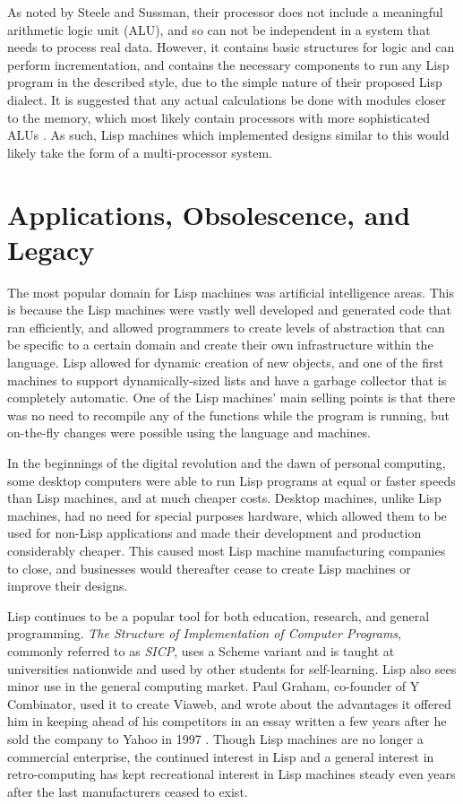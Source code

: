 \documentclass[journal]{IEEEtran}
\begin{document}
As noted by Steele and Sussman, their processor does not include a meaningful arithmetic logic unit (ALU), and so can not be independent in a system that needs to process real data. However, it contains basic structures for logic and can perform incrementation, and contains the necessary components to run any Lisp program in the described style, due to the simple nature of their proposed Lisp dialect. It is suggested that any actual calculations be done with modules closer to the memory, which most likely contain processors with more sophisticated ALUs \cite{ss}. As such, Lisp machines which implemented designs similar to this would likely take the form of a multi-processor system.

\section{Applications, Obsolescence, and Legacy}
The most popular domain for Lisp machines was  artificial intelligence areas.  This is because the Lisp machines were vastly well developed and generated code that ran efficiently, and allowed programmers to create levels of abstraction that can be specific to a certain domain and create their own infrastructure within the language. Lisp allowed for dynamic creation of new objects, and one of the first machines to support dynamically-sized lists and have a garbage collector that is completely automatic. One of the Lisp machines' main selling points is that there was no need to recompile any of the functions while the program is running, but on-the-fly changes were possible using the language and machines.

In the beginnings of the digital revolution and the dawn of personal computing, some desktop computers were able to run Lisp programs at equal or faster speeds than Lisp machines, and at much cheaper costs. Desktop machines, unlike Lisp machines, had no need for special purposes hardware, which allowed them to be used for non-Lisp applications and made their development and production considerably cheaper. This caused most Lisp machine manufacturing companies to close, and businesses would thereafter cease to create Lisp machines or improve their designs.

Lisp continues to be a popular tool for both education, research, and general programming. \textit{The Structure of Implementation of Computer Programs}, commonly referred to as \textit{SICP}, uses a Scheme variant and is taught at universities nationwide and used by other students for self-learning. Lisp also sees minor use in the general computing market. Paul Graham, co-founder of Y Combinator, used it to create Viaweb, and wrote about the advantages it offered him in keeping ahead of his competitors in an essay written a few years after he sold the company to Yahoo in 1997 \cite{graham}. Though Lisp machines are no longer a commercial enterprise, the continued interest in Lisp and a general interest in retro-computing has kept recreational interest in Lisp machines steady even years after the last manufacturers ceased to exist.
\end{document}
